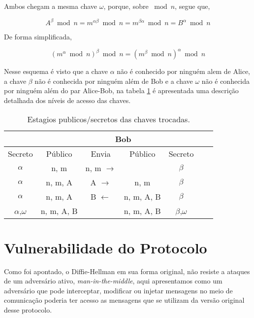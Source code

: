 \documentclass{article}
\begin{document}
Ambos chegam a mesma chave $\omega$, porque, sobre $\bmod n$, segue que,

\begin{equation}
    A^{\beta}\bmod n = m^{\alpha\beta}\bmod n = m^{\beta\alpha}\bmod n = B^{\alpha}\bmod n
\end{equation}

De forma simplificada,

\begin{equation}
    (m ^\alpha \bmod n)^\beta \bmod n = (m^\beta \bmod n)^\alpha \bmod n
\end{equation}

Nesse esquema é visto que a chave $\alpha$ não é conhecido por ninguém alem de Alice,
a chave $\beta$ não é conhecida por ninguém além de Bob e a chave $\omega$ não
é conhecida por ninguém além do par Alice-Bob, na tabela \ref{tab:alicebob} é
apresentada uma descrição detalhada dos níveis de acesso das chaves.

\begin{table}[ht]
    \centering
    \caption{Estagios publicos/secretos das chaves trocadas.}
    \label{tab:alicebob}
    \begin{tabular}{|c|c|c|c|c|c|c|}
    \hline
    \rowcolor{Gray}
    \multicolumn{2}{|c|}{Alice} &  & \multicolumn{2}{c|}{Bob} \\ \hline
       Secreto      &Público   &Envia           &Público   &Secreto   \\ \hline
       \rowcolor{LightGray}
       $\alpha$       &n, m      &n, m $\rightarrow$&          &$\beta$     \\ \hline
       $\alpha$       &n, m, A   &A $\rightarrow$   &n, m      &$\beta$     \\ \hline
       \rowcolor{LightGray}
       $\alpha$       &n, m, A   &B $\leftarrow$    &n, m, A, B&$\beta$     \\ \hline
       $\alpha$,$\omega$&n, m, A, B&                &n, m, A, B&$\beta$,$\omega$\\ \hline
    \end{tabular}
\end{table}

\section{Vulnerabilidade do Protocolo}
\label{sec:vulnerabilidade_protocolo}
Como foi apontado, o Diffie-Hellman em sua forma original, não resiste a ataques de um adversário ativo, \textit{man-in-the-middle}, aqui apresentamos como um adversário que pode interceptar, modificar ou injetar mensagens no meio de comunicação poderia ter acesso as mensagens que se utilizam da versão original desse protocolo.
\end{document}
